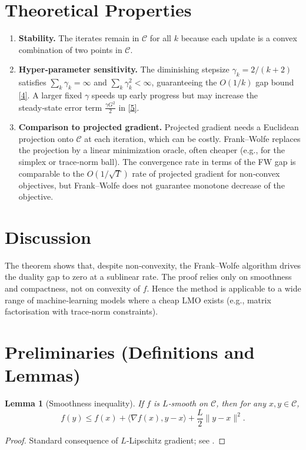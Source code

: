 \documentclass{article}
\newtheorem{lemma}{Lemma}
\begin{document}
\section*{Theoretical Properties}
\begin{enumerate}[label={P\arabic*:}, leftmargin=*]
\item \textbf{Stability.} The iterates remain in $\mathcal{C}$ for all $k$ because each update is a convex combination of two points in $\mathcal{C}$.
\item \textbf{Hyper‑parameter sensitivity.} The diminishing stepsize $\gamma_k=2/(k+2)$ satisfies $\sum_{k}\gamma_k=\infty$ and $\sum_{k}\gamma_k^{2}<\infty$, guaranteeing the $O(1/k)$ gap bound \eqref{4}. A larger fixed $\gamma$ speeds up early progress but may increase the steady‑state error term $\frac{\gamma G^{2}}{2}$ in \eqref{5}.
\item \textbf{Comparison to projected gradient.} Projected gradient needs a Euclidean projection onto $\mathcal{C}$ at each iteration, which can be costly. Frank–Wolfe replaces the projection by a linear minimization oracle, often cheaper (e.g., for the simplex or trace‑norm ball). The convergence rate in terms of the FW gap is comparable to the $O(1/\sqrt{T})$ rate of projected gradient for non‑convex objectives, but Frank–Wolfe does not guarantee monotone decrease of the objective.
\end{enumerate}

\section*{Discussion}
The theorem shows that, despite non‑convexity, the Frank–Wolfe algorithm drives the duality gap to zero at a sublinear rate. The proof relies only on smoothness and compactness, not on convexity of $f$. Hence the method is applicable to a wide range of machine‑learning models where a cheap LMO exists (e.g., matrix factorisation with trace‑norm constraints).

\section*{Preliminaries (Definitions and Lemmas)}
\begin{lemma}[Smoothness inequality]
\label{lem:smooth}
If $f$ is $L$‑smooth on $\mathcal{C}$, then for any $x,y\in\mathcal{C}$,
\[
f(y)\le f(x)+\langle\nabla f(x),y-x\rangle+\frac{L}{2}\|y-x\|^{2}.
\tag{L1}
\]
\end{lemma}
\begin{proof}
Standard consequence of $L$‑Lipschitz gradient; see \cite{nesterov2004introductory}.
\end{proof}
\end{document}
